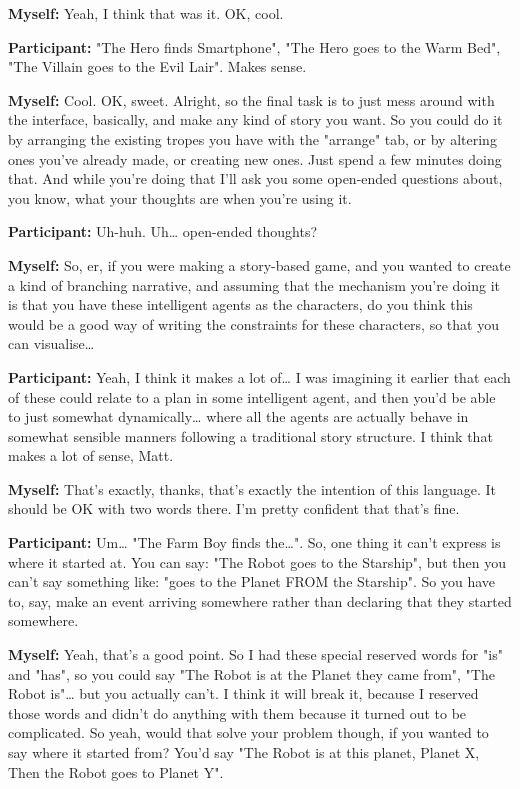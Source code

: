 \documentclass[11pt]{report}
\newcommand{\llabel}[1]{\hypertarget{llineno:#1}{\linelabel{#1}}}
\begin{document}
\begin{linenumbers}
\textbf{Myself:} Yeah, I think that was it. OK, cool.

\textbf{Participant:} "The Hero finds Smartphone", "The Hero goes to the Warm Bed", "The Villain goes to the Evil Lair". Makes sense.

\textbf{Myself:} Cool. OK, sweet. Alright, so the final task is to just mess around with the interface, basically, and make any kind of story you want. So you could do it by arranging the existing tropes you have with the "arrange" tab, or by altering ones you've already made, or creating new ones. Just spend a few minutes doing that. And while you're doing that I'll ask you some open-ended questions about, you know, what your thoughts are when you're using it.

\textbf{Participant:} Uh-huh. Uh\ldots{} open-ended thoughts?

\textbf{Myself:} So, er, if you were making a story-based game, and you wanted to create a kind of branching narrative, and assuming that the mechanism you're doing it is that you have these intelligent agents as the characters, do you think this would be a good way of writing the constraints for these characters, so that you can visualise\ldots{}

\textbf{Participant:} Yeah, I think it makes a lot of\ldots{} I was imagining it
earlier that each of these could relate to a plan in some intelligent agent, and
then you'd be able to just somewhat dynamically\ldots{} where all the agents are
actually behave in somewhat sensible manners following a traditional story
structure. I think that makes a lot of sense, Matt.\llabel{lne:use1d2}

\textbf{Myself:} That's exactly, thanks, that's exactly the intention of this language. It should be OK with two words there. I'm pretty confident that that's fine.

\textbf{Participant:} Um\ldots{} "The Farm Boy finds the\ldots{}". So, one thing
it can't express is where it started at. You can say: "The Robot goes to the
Starship", but then you can't say something like: "goes to the Planet FROM the
Starship". So you have to, say, make an event arriving somewhere rather than
declaring that they started somewhere.\llabel{lne:feature2d}

\textbf{Myself:} Yeah, that's a good point. So I had these special reserved words for "is" and "has", so you could say "The Robot is at the Planet they came from", "The Robot is"\ldots{} but you actually can't. I think it will break it, because I reserved those words and didn't do anything with them because it turned out to be complicated. So yeah, would that solve your problem though, if you wanted to say where it started from? You'd say "The Robot is at this planet, Planet X, Then the Robot goes to Planet Y".


\end{linenumbers}
\end{document}
